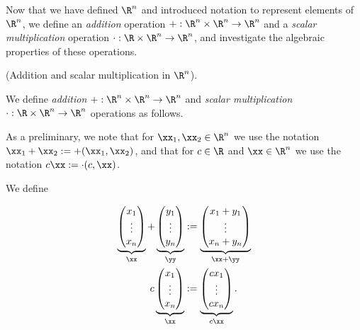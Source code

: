 Now that we have defined $\R^n$ and introduced notation to represent elements of $\R^n$, we define an \textit{addition} operation $+:\R^n \times \R^n \rightarrow \R^n$ and a \textit{scalar multiplication} operation $\cdot: \R \times \R^n \rightarrow \R^n$, and investigate the algebraic properties of these operations.

\begin{defn}
    (Addition and scalar multiplication in $\R^n$).
    
    We define \textit{addition} $+:\R^n \times \R^n \rightarrow \R^n$ and \textit{scalar multiplication} $\cdot:\R \times \R^n \rightarrow \R^n$ operations as follows.
    
    As a preliminary, we note that for $\xx_1, \xx_2 \in \R^n$ we use the notation $\xx_1 + \xx_2 := +(\xx_1, \xx_2)$, and that for $c \in \R$ and $\xx \in \R^n$ we use the notation $c \xx := \cdot(c, \xx)$.
    
    We define
    
    \begin{align*}
        \underbrace
        {
            \begin{pmatrix}
                x_1 \\ \vdots \\ x_n
            \end{pmatrix}
        }_\xx
        +
        \underbrace
        {
            \begin{pmatrix}
                y_1 \\ \vdots \\ y_n
            \end{pmatrix}
        }_\yy
        &:=
        \underbrace
        {
            \begin{pmatrix}
                x_1 + y_1 \\ \vdots \\ x_n + y_n
            \end{pmatrix}
        }_{\xx + \yy}
        \\
        c
        \underbrace
        {
            \begin{pmatrix}
                x_1 \\ \vdots \\ x_n
            \end{pmatrix}
        }_\xx
        &:=
        \underbrace
        {
            \begin{pmatrix}
                c x_1 \\ \vdots \\ c x_n
            \end{pmatrix}
        }_{c \xx}.
    \end{align*}
\end{defn}

